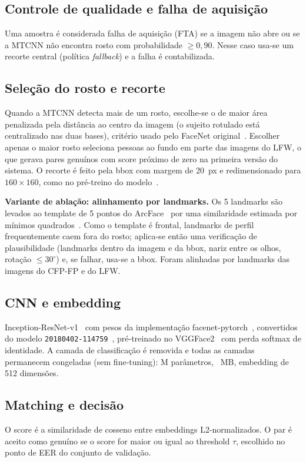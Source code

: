 \documentclass[conference,a4paper]{IEEEtran}
\begin{document}
\subsection{Controle de qualidade e falha de aquisição}
Uma amostra é considerada falha de aquisição (FTA) se a imagem não abre ou se a MTCNN
não encontra rosto com probabilidade $\geq 0{,}90$. Nesse caso usa-se um recorte
central (política \emph{fallback}) e a falha é contabilizada.

\subsection{Seleção do rosto e recorte}
Quando a MTCNN detecta mais de um rosto, escolhe-se o de maior área penalizada pela
distância ao centro da imagem (o sujeito rotulado está centralizado nas duas bases),
critério usado pelo FaceNet original~\cite{sandberg_facenet}. Escolher apenas o maior
rosto seleciona pessoas ao fundo em parte das imagens do LFW, o que gerava pares
genuínos com score próximo de zero na primeira versão do sistema. O recorte é feito pela bbox com
margem de 20~px e redimensionado para $160\times160$, como no pré-treino do
modelo~\cite{sandberg_facenet}.

\textbf{Variante de ablação: alinhamento por landmarks.} Os 5 landmarks são levados ao
template de 5 pontos do ArcFace~\cite{deng2019arcface} por uma similaridade estimada
por mínimos quadrados~\cite{umeyama1991least}. Como o template é frontal, landmarks de
perfil frequentemente caem fora do rosto; aplica-se então uma verificação de
plausibilidade (landmarks dentro da imagem e da bbox, nariz entre os olhos, rotação
$\leq 30^\circ$) e, se falhar, usa-se a bbox. Foram alinhadas por landmarks
\alignCFP{} das imagens do CFP-FP e \alignLFW{} do LFW.

\subsection{CNN e embedding}
Inception-ResNet-v1~\cite{szegedy2017inception} com pesos da implementação
facenet-pytorch~\cite{esler_facenet_pytorch}, convertidos do modelo
\texttt{20180402-114759}~\cite{sandberg_facenet}, pré-treinado no
VGGFace2~\cite{cao2018vggface2} com perda softmax de identidade. A camada de
classificação é removida e todas as camadas permanecem congeladas (sem fine-tuning):
\paramsM{}M parâmetros, \pesoMB{}~MB, embedding de 512 dimensões.

\subsection{Matching e decisão}
O score é a similaridade de cosseno entre embeddings L2-normalizados. O par é aceito
como genuíno se o score for maior ou igual ao threshold $\tau$, escolhido no ponto de
EER do conjunto de validação.
\end{document}
